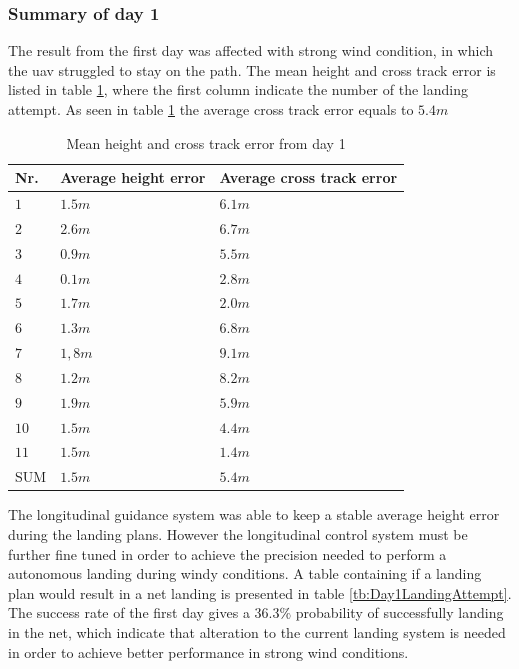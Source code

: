 \subsubsection{Summary of day 1}\label{sss:summaryDay1}
The result from the first day was affected with strong wind condition, in which the \gls{uav} struggled to stay on the path. The mean height and cross track error is listed in table \ref{tb:Day1HeightCrossTrack}, where the first column indicate the number of the landing attempt. As seen in table \ref{tb:Day1HeightCrossTrack} the average cross track error equals to $5.4 m$
\begin{table}[H]
\centering
\begin{tabular}{| l | l | l |}
\hline
\textbf{Nr.} 	& \textbf{Average height error} 	& \textbf{Average cross track error}  \\ \hline
$1$				& $1.5 m$							& $6.1 m$								\\ \hline
$2$				& $2.6 m$							& $6.7 m$								\\ \hline
$3$				& $0.9 m$							& $5.5 m$								\\ \hline
$4$				& $0.1 m$							& $2.8 m$								\\ \hline
$5$				& $1.7 m$							& $2.0 m$								\\ \hline
$6$				& $1.3 m$							& $6.8 m$								\\ \hline
$7$				& $1,8 m$							& $9.1 m$								\\ \hline
$8$				& $1.2 m$							& $8.2 m$								\\ \hline
$9$				& $1.9 m$							& $5.9 m$								\\ \hline
$10$			& $1.5 m$							& $4.4 m$								\\ \hline
$11$			& $1.5 m$							& $1.4 m$								\\ \hline
SUM				& $1.5 m$							& $5.4 m$								\\ \hline
\end{tabular}
\caption{Mean height and cross track error from day 1}
\label{tb:Day1HeightCrossTrack}
\end{table}
The longitudinal guidance system was able to keep a stable average height error during the landing plans. However the longitudinal control system must be further fine tuned in order to achieve the precision needed to perform a autonomous landing during windy conditions. A table containing if a landing plan would result in a net landing is presented in table \ref{tb:Day1LandingAttempt}. The success rate of the first day gives a $36.3  \% $ probability of successfully landing in the net, which indicate that alteration to the current landing system is needed in order to achieve better performance in strong wind conditions.
